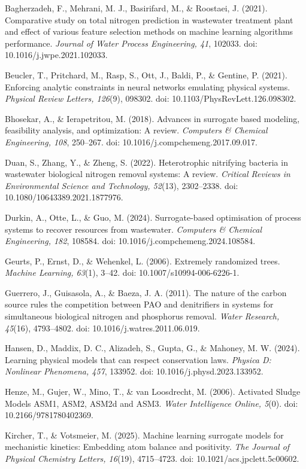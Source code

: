 \documentclass[a4paper,fleqn]{cas-sc}
\begin{document}
\noindent Bagherzadeh, F., Mehrani, M. J., Basirifard, M., \& Roostaei, J. (2021). Comparative study on total nitrogen prediction in wastewater treatment plant and effect of various feature selection methods on machine learning algorithms performance. \textit{Journal of Water Process Engineering, 41}, 102033. doi: 10.1016/j.jwpe.2021.102033.

\noindent Beucler, T., Pritchard, M., Rasp, S., Ott, J., Baldi, P., \& Gentine, P. (2021). Enforcing analytic constraints in neural networks emulating physical systems. \textit{Physical Review Letters, 126}(9), 098302. doi: 10.1103/PhysRevLett.126.098302.

\noindent Bhosekar, A., \& Ierapetritou, M. (2018). Advances in surrogate based modeling, feasibility analysis, and optimization: A review. \textit{Computers \& Chemical Engineering, 108}, 250--267. doi: 10.1016/j.compchemeng.2017.09.017.

\noindent Duan, S., Zhang, Y., \& Zheng, S. (2022). Heterotrophic nitrifying bacteria in wastewater biological nitrogen removal systems: A review. \textit{Critical Reviews in Environmental Science and Technology, 52}(13), 2302--2338. doi: 10.1080/10643389.2021.1877976.

\noindent Durkin, A., Otte, L., \& Guo, M. (2024). Surrogate-based optimisation of process systems to recover resources from wastewater. \textit{Computers \& Chemical Engineering, 182}, 108584. doi: 10.1016/j.compchemeng.2024.108584.

\noindent Geurts, P., Ernst, D., \& Wehenkel, L. (2006). Extremely randomized trees. \textit{Machine Learning, 63}(1), 3--42. doi: 10.1007/s10994-006-6226-1.

\noindent Guerrero, J., Guisasola, A., \& Baeza, J. A. (2011). The nature of the carbon source rules the competition between PAO and denitrifiers in systems for simultaneous biological nitrogen and phosphorus removal. \textit{Water Research, 45}(16), 4793--4802. doi: 10.1016/j.watres.2011.06.019.

\noindent Hansen, D., Maddix, D. C., Alizadeh, S., Gupta, G., \& Mahoney, M. W. (2024). Learning physical models that can respect conservation laws. \textit{Physica D: Nonlinear Phenomena, 457}, 133952. doi: 10.1016/j.physd.2023.133952.

\noindent Henze, M., Gujer, W., Mino, T., \& van Loosdrecht, M. (2006). Activated Sludge Models ASM1, ASM2, ASM2d and ASM3. \textit{Water Intelligence Online, 5}(0). doi: 10.2166/9781780402369.

\noindent Kircher, T., \& Votsmeier, M. (2025). Machine learning surrogate models for mechanistic kinetics: Embedding atom balance and positivity. \textit{The Journal of Physical Chemistry Letters, 16}(19), 4715--4723. doi: 10.1021/acs.jpclett.5c00602.
\end{document}
